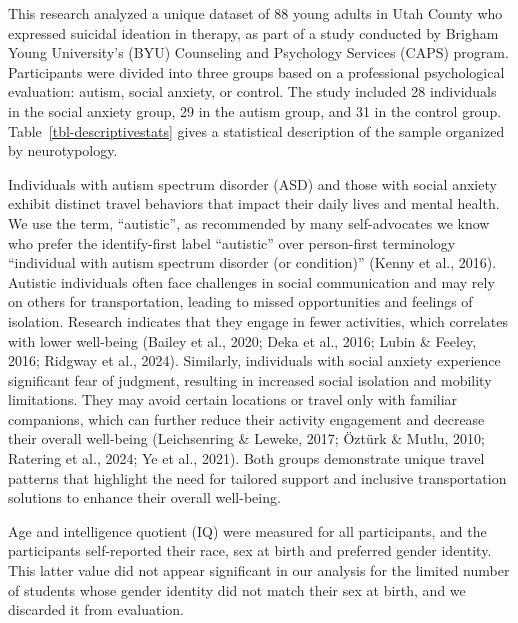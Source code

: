 \documentclass[
  letterpaper,
  number,
  review,
  3p]{elsarticle}
\begin{document}
This research analyzed a unique dataset of 88 young adults in Utah
County who expressed suicidal ideation in therapy, as part of a study
conducted by Brigham Young University's (BYU) Counseling and Psychology
Services (CAPS) program. Participants were divided into three groups
based on a professional psychological evaluation: autism, social
anxiety, or control. The study included 28 individuals in the social
anxiety group, 29 in the autism group, and 31 in the control group.
Table~\ref{tbl-descriptivestats} gives a statistical description of the
sample organized by neurotypology.

Individuals with autism spectrum disorder (ASD) and those with social
anxiety exhibit distinct travel behaviors that impact their daily lives
and mental health. We use the term, ``autistic'', as recommended by many
self-advocates we know who prefer the identify-first label ``autistic''
over person-first terminology ``individual with autism spectrum disorder
(or condition)'' (Kenny et al., 2016). Autistic individuals often face
challenges in social communication and may rely on others for
transportation, leading to missed opportunities and feelings of
isolation. Research indicates that they engage in fewer activities,
which correlates with lower well-being (Bailey et al., 2020; Deka et
al., 2016; Lubin \& Feeley, 2016; Ridgway et al., 2024). Similarly,
individuals with social anxiety experience significant fear of judgment,
resulting in increased social isolation and mobility limitations. They
may avoid certain locations or travel only with familiar companions,
which can further reduce their activity engagement and decrease their
overall well-being (Leichsenring \& Leweke, 2017; Öztürk \& Mutlu, 2010;
Ratering et al., 2024; Ye et al., 2021). Both groups demonstrate unique
travel patterns that highlight the need for tailored support and
inclusive transportation solutions to enhance their overall well-being.

Age and intelligence quotient (IQ) were measured for all participants,
and the participants self-reported their race, sex at birth and
preferred gender identity. This latter value did not appear significant
in our analysis for the limited number of students whose gender identity
did not match their sex at birth, and we discarded it from evaluation.
\end{document}
